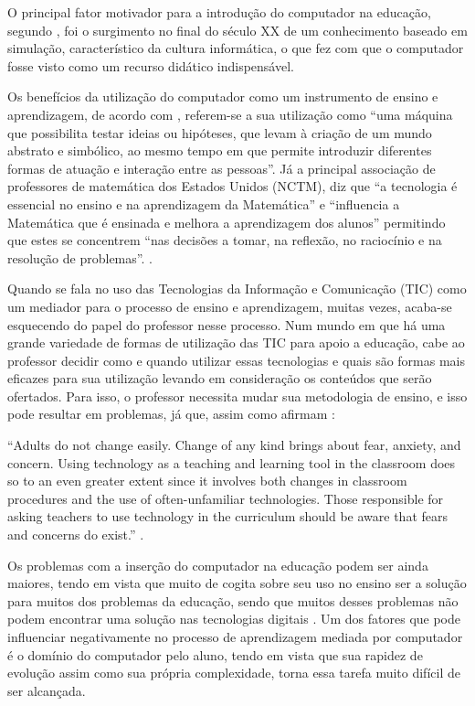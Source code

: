 O principal fator motivador para a introdução do computador na educação, segundo , foi o surgimento no final do século XX de um conhecimento baseado em simulação, 
característico da cultura informática, o que fez com que o computador fosse visto como  um recurso didático  indispensável.

Os benefícios da utilização do computador como um instrumento de ensino e aprendizagem, de acordo com , referem-se a sua utilização como ``uma máquina que 
possibilita testar ideias ou hipóteses, que levam à criação de um mundo abstrato e simbólico, ao mesmo tempo em que permite introduzir diferentes formas de atuação e interação entre as pessoas''. Já a 
principal associação de professores de matemática dos Estados Unidos (NCTM), diz que ``a tecnologia é essencial no ensino e 
na aprendizagem da Matemática'' e ``influencia a Matemática que é ensinada e melhora a aprendizagem dos alunos'' permitindo que estes se concentrem ``nas decisões a tomar, na reflexão, no raciocínio e 
na resolução de problemas''. \cite[p.26]{melo2007principios}.

Quando se fala no uso das Tecnologias da Informação e Comunicação (TIC) como um mediador para o processo de ensino e aprendizagem, muitas vezes, acaba-se esquecendo do papel do professor nesse 
processo. Num mundo em que há uma grande variedade de formas de utilização das TIC para apoio a educação, cabe ao professor decidir como e quando utilizar essas tecnologias e quais s\~ao formas 
mais eficazes para sua utilização levando em consideração os conteúdos que serão ofertados. Para isso, o professor necessita mudar sua metodologia de ensino, e isso pode resultar em problemas, já 
que, assim como afirmam :

\begin{citacao}
``Adults do not change easily. Change of any kind brings about fear, anxiety, and concern. Using technology as a teaching and learning tool in the classroom does so to an even greater extent since it involves both changes in classroom procedures and the use of often-unfamiliar technologies. Those responsible for asking teachers to use technology in the curriculum should be aware that fears and concerns do exist.'' \cite[p.~96]{bitner2002integrating}.
\end{citacao}

Os problemas com a inserção do computador na educação podem ser ainda maiores, tendo em vista que muito de cogita sobre seu uso no ensino ser a solução para muitos dos problemas da educação, sendo que muitos desses problemas não podem encontrar uma solução nas tecnologias digitais \cite{silva2009ambiente}. Um dos fatores que pode influenciar negativamente no processo de aprendizagem mediada por computador é o domínio do computador pelo aluno, tendo em vista que sua rapidez de evolução assim como sua própria complexidade, torna essa tarefa muito difícil de ser alcançada.

